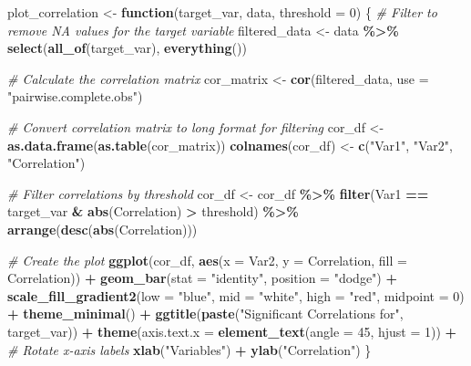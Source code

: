 \documentclass[
]{article}
\newenvironment{Shaded}{\begin{snugshade}}{\end{snugshade}}
\newcommand{\AttributeTok}[1]{\textcolor[rgb]{0.13,0.29,0.53}{#1}}
\newcommand{\CommentTok}[1]{\textcolor[rgb]{0.56,0.35,0.01}{\textit{#1}}}
\newcommand{\ControlFlowTok}[1]{\textcolor[rgb]{0.13,0.29,0.53}{\textbf{#1}}}
\newcommand{\DecValTok}[1]{\textcolor[rgb]{0.00,0.00,0.81}{#1}}
\newcommand{\FunctionTok}[1]{\textcolor[rgb]{0.13,0.29,0.53}{\textbf{#1}}}
\newcommand{\NormalTok}[1]{#1}
\newcommand{\OtherTok}[1]{\textcolor[rgb]{0.56,0.35,0.01}{#1}}
\newcommand{\SpecialCharTok}[1]{\textcolor[rgb]{0.81,0.36,0.00}{\textbf{#1}}}
\newcommand{\StringTok}[1]{\textcolor[rgb]{0.31,0.60,0.02}{#1}}
\begin{document}
\begin{Shaded}
\begin{Highlighting}[]
\NormalTok{plot\_correlation }\OtherTok{\textless{}{-}} \ControlFlowTok{function}\NormalTok{(target\_var, data, }\AttributeTok{threshold =} \DecValTok{0}\NormalTok{) \{}
  \CommentTok{\# Filter to remove NA values for the target variable}
\NormalTok{  filtered\_data }\OtherTok{\textless{}{-}}\NormalTok{ data }\SpecialCharTok{\%\textgreater{}\%}
    \FunctionTok{select}\NormalTok{(}\FunctionTok{all\_of}\NormalTok{(target\_var), }\FunctionTok{everything}\NormalTok{())}
    
  
  \CommentTok{\# Calculate the correlation matrix}
\NormalTok{  cor\_matrix }\OtherTok{\textless{}{-}} \FunctionTok{cor}\NormalTok{(filtered\_data, }\AttributeTok{use =} \StringTok{"pairwise.complete.obs"}\NormalTok{)}
  
  \CommentTok{\# Convert correlation matrix to long format for filtering}
\NormalTok{  cor\_df }\OtherTok{\textless{}{-}} \FunctionTok{as.data.frame}\NormalTok{(}\FunctionTok{as.table}\NormalTok{(cor\_matrix))}
  \FunctionTok{colnames}\NormalTok{(cor\_df) }\OtherTok{\textless{}{-}} \FunctionTok{c}\NormalTok{(}\StringTok{"Var1"}\NormalTok{, }\StringTok{"Var2"}\NormalTok{, }\StringTok{"Correlation"}\NormalTok{)}
  
  \CommentTok{\# Filter correlations by threshold}
\NormalTok{  cor\_df }\OtherTok{\textless{}{-}}\NormalTok{ cor\_df }\SpecialCharTok{\%\textgreater{}\%}
    \FunctionTok{filter}\NormalTok{(Var1 }\SpecialCharTok{==}\NormalTok{ target\_var }\SpecialCharTok{\&} \FunctionTok{abs}\NormalTok{(Correlation) }\SpecialCharTok{\textgreater{}}\NormalTok{ threshold) }\SpecialCharTok{\%\textgreater{}\%}
    \FunctionTok{arrange}\NormalTok{(}\FunctionTok{desc}\NormalTok{(}\FunctionTok{abs}\NormalTok{(Correlation)))}
  
  \CommentTok{\# Create the plot}
  \FunctionTok{ggplot}\NormalTok{(cor\_df, }\FunctionTok{aes}\NormalTok{(}\AttributeTok{x =}\NormalTok{ Var2, }\AttributeTok{y =}\NormalTok{ Correlation, }\AttributeTok{fill =}\NormalTok{ Correlation)) }\SpecialCharTok{+}
    \FunctionTok{geom\_bar}\NormalTok{(}\AttributeTok{stat =} \StringTok{"identity"}\NormalTok{, }\AttributeTok{position =} \StringTok{"dodge"}\NormalTok{) }\SpecialCharTok{+}
    \FunctionTok{scale\_fill\_gradient2}\NormalTok{(}\AttributeTok{low =} \StringTok{"blue"}\NormalTok{, }\AttributeTok{mid =} \StringTok{"white"}\NormalTok{, }\AttributeTok{high =} \StringTok{"red"}\NormalTok{, }\AttributeTok{midpoint =} \DecValTok{0}\NormalTok{) }\SpecialCharTok{+}
    \FunctionTok{theme\_minimal}\NormalTok{() }\SpecialCharTok{+}
    \FunctionTok{ggtitle}\NormalTok{(}\FunctionTok{paste}\NormalTok{(}\StringTok{"Significant Correlations for"}\NormalTok{, target\_var)) }\SpecialCharTok{+}
    \FunctionTok{theme}\NormalTok{(}\AttributeTok{axis.text.x =} \FunctionTok{element\_text}\NormalTok{(}\AttributeTok{angle =} \DecValTok{45}\NormalTok{, }\AttributeTok{hjust =} \DecValTok{1}\NormalTok{)) }\SpecialCharTok{+} \CommentTok{\# Rotate x{-}axis labels}
    \FunctionTok{xlab}\NormalTok{(}\StringTok{"Variables"}\NormalTok{) }\SpecialCharTok{+}
    \FunctionTok{ylab}\NormalTok{(}\StringTok{"Correlation"}\NormalTok{)}
\NormalTok{\}}


\end{Highlighting}
\end{Shaded}
\end{document}
